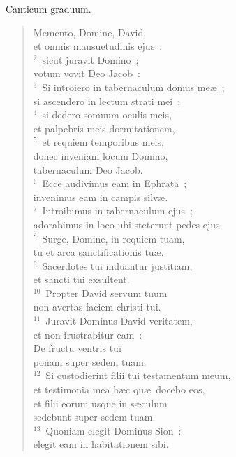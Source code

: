 \bchapter
\lettrine[lines=3,image=true,loversize=0.05,lraise=-0.03]{C}{}anticum graduum. \begin{flushleft}\begin{verse}\vspace{6pt}Memento, Domine, David,\\ et omnis mansuetudinis ejus~:\\
${}^{2}$~sicut juravit Domino~;\\ votum vovit Deo Jacob~:\\
${}^{3}$~Si introiero in tabernaculum domus me\ae~;\\ si ascendero in lectum strati mei~;\\
${}^{4}$~si dedero somnum oculis meis,\\ et palpebris meis dormitationem,\\
${}^{5}$~et requiem temporibus meis,\\ donec inveniam locum Domino,\\ tabernaculum Deo Jacob.\\
${}^{6}$~Ecce audivimus eam in Ephrata~;\\ invenimus eam in campis silv\ae .\\
${}^{7}$~Introibimus in tabernaculum ejus~;\\ adorabimus in loco ubi steterunt pedes ejus.\\
${}^{8}$~Surge, Domine, in requiem tuam,\\ tu et arca sanctificationis tu\ae .\\
${}^{9}$~Sacerdotes tui induantur justitiam,\\ et sancti tui exsultent.\\
${}^{10}$~Propter David servum tuum\\ non avertas faciem christi tui.\\
${}^{11}$~Juravit Dominus David veritatem,\\ et non frustrabitur eam~:\\ De fructu ventris tui\\ ponam super sedem tuam.\\
${}^{12}$~Si custodierint filii tui testamentum meum,\\ et testimonia mea h\ae c qu\ae\ docebo eos,\\ et filii eorum usque in s\ae culum\\ sedebunt super sedem tuam.\\
${}^{13}$~Quoniam elegit Dominus Sion~:\\ elegit eam in habitationem sibi.\\

\end{verse}
\end{flushleft}
